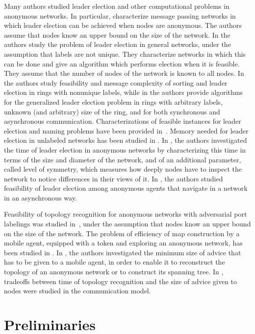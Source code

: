 \documentclass[a4paper,10pt]{article}
\begin{document}
Many authors \cite{An,ASW,AtSn,BV,DKMP,Kr,KKV,Saka,YK,YK3} studied leader election
and other computational problems
in anonymous networks. In particular, \cite{BSVCGS,YK3} characterize message passing networks in which
leader election can be achieved when nodes are anonymous. 
The authors assume that nodes know an upper bound on the size of the network. In \cite{YK2} the authors study
the problem of leader election in general networks, under the assumption that labels are
not unique. They characterize networks in which this can be done and give an algorithm
which performs election when it is feasible. They assume that the number of nodes of the
network is known to all nodes. In
 \cite{FKKLS}  the authors
study feasibility and message complexity of sorting and leader election in rings with
nonunique labels, while in \cite{DoPe} the authors provide algorithms for the
generalized leader election problem in rings with arbitrary labels,
unknown (and arbitrary) size of the ring, and for both
synchronous and asynchronous communication. 
Characterizations of feasible instances for leader election and naming problems have been provided in~\cite{C,CMM,CM}.
Memory needed for leader election in unlabeled networks has been studied in \cite{FP}. 
In \cite{FP1}, the authors investigated the time of leader election in anonymous networks
by characterizing this time in terms of the size and diameter of the network, and of an additional
parameter, called level of symmetry, which measures how deeply nodes have to inspect the network to notice differences in their views of it.
In \cite{DP1}, the authors studied feasibility of leader election among anonymous agents that
navigate in a network in an asynchronous way.


Feasibility of topology recognition for anonymous networks with adversarial port labelings was studied in~\cite{YK3},
under the assumption that nodes know an upper bound on the size of the network.
The problem of efficiency of map construction by a mobile agent, equipped with a token and exploring an anonymous network,  has
been studied in \cite{CDK}. In \cite{DP}, the authors investigated the minimum size of advice
that has to be given to a mobile agent, in order to enable it to reconstruct  the topology of an anonymous network or to construct its spanning tree.
In \cite{FPR},
tradeoffs between time of topology recognition and the size of advice given to nodes were studied
in the  communication model.  



\section{Preliminaries} \label{sec:feasibility}
\end{document}
